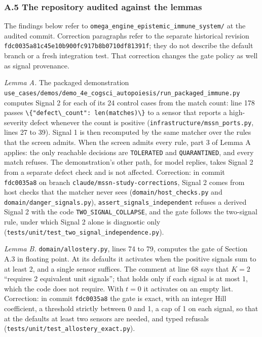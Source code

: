 \documentclass[
  11pt,
]{article}
\newcommand{\passthrough}[1]{#1}
\begin{document}
\subsubsection{A.5 The repository audited against the
lemmas}\label{a.5-the-repository-audited-against-the-lemmas}

The findings below refer to
\nolinkurl{omega_engine_epistemic_immune_system/} at the audited commit.
Correction paragraphs refer to the separate historical revision
\nolinkurl{fdc0035a81c45e10b900fc917b8b0710df81391f}; they do not
describe the default branch or a fresh integration test. That correction
changes the gate policy as well as signal provenance.

\emph{Lemma A.} The packaged demonstration
\nolinkurl{use_cases/demos/demo_4e_cogsci_autopoiesis/run_packaged_immune.py}
computes Signal 2 for each of its 24 control cases from the match count:
line 178 passes
\passthrough{\lstinline!\{"defect\_count": len(matches)\}!} to a sensor
that reports a high-severity defect whenever the count is positive
(\nolinkurl{infrastructure/mssn_ports.py}, lines 27 to 39). Signal 1 is
then recomputed by the same matcher over the rules that the screen
admits. When the screen admits every rule, part 3 of Lemma A applies:
the only reachable decisions are \passthrough{\lstinline!TOLERATED!} and
\passthrough{\lstinline!QUARANTINED!}, and every match refuses. The
demonstration's other path, for model replies, takes Signal 2 from a
separate defect check and is not affected. Correction: in commit
\passthrough{\lstinline!fdc0035a8!} on branch
\nolinkurl{claude/mssn-study-corrections}, Signal 2 comes from host
checks that the matcher never sees (\nolinkurl{domain/host_checks.py}
and \nolinkurl{domain/danger_signals.py}),
\nolinkurl{assert_signals_independent} refuses a derived Signal 2 with
the code \nolinkurl{TWO_SIGNAL_COLLAPSE}, and the gate follows the
two-signal rule, under which Signal 2 alone is diagnostic only
(\nolinkurl{tests/unit/test_two_signal_independence.py}).

\emph{Lemma B.} \nolinkurl{domain/allostery.py}, lines 74 to 79,
computes the gate of Section A.3 in floating point. At its defaults it
activates when the positive signals sum to at least 2, and a single
sensor suffices. The comment at line 68 says that \(K = 2\) ``requires 2
equivalent unit signals''; that holds only if each signal is at most 1,
which the code does not require. With \(t = 0\) it activates on an empty
list. Correction: in commit \passthrough{\lstinline!fdc0035a8!} the gate
is exact, with an integer Hill coefficient, a threshold strictly between
0 and 1, a cap of 1 on each signal, so that at the defaults at least two
sensors are needed, and typed refusals
(\nolinkurl{tests/unit/test_allostery_exact.py}).
\end{document}
